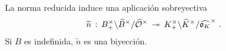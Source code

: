 \begin{coroNormaReducidaClasesEstrictas}\label{coro:normaclasesestrictas}
	La norma reducida induce una aplicaci\'{o}n sobreyectiva
	\begin{align*}
		\widetilde{n} & \,:\,
			B_{+}^{\times}\backslash\widehat{B}^{\times}/\widehat{\mathcal{O}}^{\times}
			\,\twoheadrightarrow\,
			K_{+}^{\times}\backslash\widehat{K}^{\times}/\widehat{\mathfrak{o}_{K}}^{\times}
		\text{ .}
	\end{align*}
	Si $B$ es indefinida, $\widetilde{n}$ es una biyecci\'{o}n.
\end{coroNormaReducidaClasesEstrictas}
%
